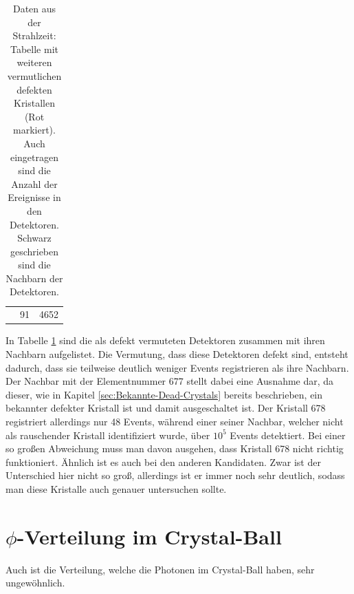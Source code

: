 \documentclass[a4paper,11pt,oneside,final,german,openbib,pdftex]{scrbook}
\begin{document}
{\begin{table}[h!]
\begin{center}
\begin{tabular}{lcc}
 	&91&4652 \\
 	
 	
 	
 	\end{tabular}
 \caption[Strahlzeit: Vermutete defekte Kristalle und ihre Nachbarn mit Anzahl ihrer Events]{Daten aus der Strahlzeit: Tabelle mit weiteren vermutlichen defekten Kristallen (Rot markiert). Auch eingetragen sind die Anzahl der Ereignisse in den Detektoren. Schwarz geschrieben sind die Nachbarn der Detektoren.}
\label{tab:Vermutete-Dead-Crystals} 
\end{center}
 \end{table}
 
 In Tabelle \ref{tab:Vermutete-Dead-Crystals} sind die als defekt vermuteten Detektoren zusammen mit ihren Nachbarn aufgelistet. Die Vermutung, dass diese Detektoren defekt sind, entsteht dadurch, dass sie teilweise deutlich weniger Events registrieren als ihre Nachbarn. Der Nachbar mit der Elementnummer 677 stellt dabei eine Ausnahme dar, da dieser, wie in Kapitel \ref{sec:Bekannte-Dead-Crystals} bereits beschrieben, ein bekannter defekter Kristall ist und damit ausgeschaltet ist. Der Kristall 678 registriert allerdings nur 48 Events, w\"ahrend einer seiner Nachbar, welcher nicht als rauschender Kristall identifiziert wurde, \"uber $10^5$ Events detektiert. Bei einer so gro{\ss}en Abweichung muss man davon ausgehen, dass Kristall 678 nicht richtig funktioniert.  
 \"Ahnlich ist es auch bei den anderen Kandidaten. Zwar ist der Unterschied hier nicht so gro{\ss}, allerdings ist er immer noch sehr deutlich, sodass man diese Kristalle auch genauer untersuchen sollte.


\section{$\phi$-Verteilung im Crystal-Ball}

Auch ist die Verteilung, welche die Photonen im Crystal-Ball haben, sehr ungew\"ohnlich.

}
\end{document}
